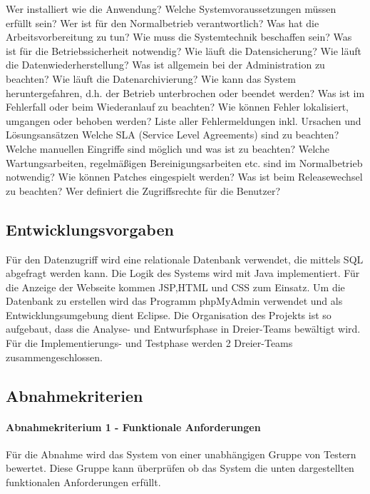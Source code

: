 \documentclass[12pt,a4paper]{article}
\begin{document}
{Wer installiert wie die Anwendung?
Welche Systemvoraussetzungen müssen erfüllt sein?
Wer ist für den Normalbetrieb verantwortlich?
Was hat die Arbeitsvorbereitung zu tun?
Wie muss die Systemtechnik beschaffen sein?
Was ist für die Betriebssicherheit notwendig?
Wie läuft die Datensicherung?
Wie läuft die Datenwiederherstellung?
Was ist allgemein bei der Administration zu beachten?
Wie läuft die Datenarchivierung?
Wie kann das System heruntergefahren, d.h. der Betrieb unterbrochen oder beendet werden?
Was ist im Fehlerfall oder beim Wiederanlauf zu beachten?
Wie können Fehler lokalisiert, umgangen oder behoben werden?
Liste aller Fehlermeldungen inkl. Ursachen und Lösungsansätzen
Welche SLA (Service Level Agreements) sind zu beachten?
Welche manuellen Eingriffe sind möglich und was ist zu beachten?
Welche Wartungsarbeiten, regelmäßigen Bereinigungsarbeiten etc. sind im Normalbetrieb notwendig?
Wie können Patches eingespielt werden?
Was ist beim Releasewechsel zu beachten?
Wer definiert die Zugriffsrechte für die Benutzer? 

\subsection{Entwicklungsvorgaben}
Für den Datenzugriff wird eine relationale Datenbank verwendet, die mittels SQL abgefragt werden kann. Die Logik des Systems wird mit Java implementiert. Für die Anzeige der Webseite kommen JSP,HTML und CSS zum Einsatz. Um die Datenbank zu erstellen wird das Programm phpMyAdmin verwendet und als Entwicklungsumgebung dient Eclipse. Die Organisation des Projekts ist so aufgebaut, dass die Analyse- und Entwurfsphase in Dreier-Teams bewältigt wird. Für die Implementierungs- und Testphase werden 2 Dreier-Teams zusammengeschlossen.

\subsection{Abnahmekriterien}


\paragraph{Abnahmekriterium 1 - Funktionale Anforderungen}
Für die Abnahme wird das System von einer unabhängigen Gruppe von Testern bewertet. Diese Gruppe kann überprüfen ob das System die unten dargestellten funktionalen Anforderungen erfüllt.\\

}
\end{document}
